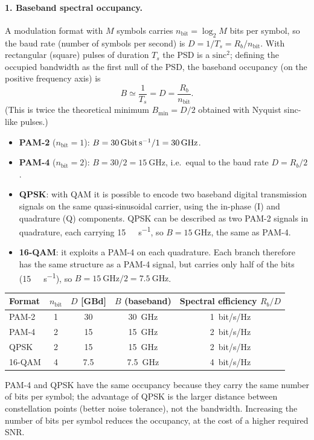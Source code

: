 \paragraph{1. Baseband spectral occupancy.}
A modulation format with $M$ symbols carries $n_\mathrm{bit} = \log_2 M$ bits per symbol, so the baud rate
(number of symbols per second) is $D = 1/T_s = R_b/n_\mathrm{bit}$. With rectangular (square) pulses of duration
$T_s$ the PSD is a $\mathrm{sinc}^2$; defining the occupied bandwidth as the first null of the PSD, the baseband
occupancy (on the positive frequency axis) is
\begin{equation}
  B \simeq \frac{1}{T_s} = D = \frac{R_b}{n_\mathrm{bit}} .
\end{equation}
(This is twice the theoretical minimum $B_\mathrm{min} = D/2$ obtained with Nyquist sinc-like pulses.)
\begin{itemize}
  \item \textbf{PAM-2} ($n_\mathrm{bit}=1$): $B = \SI{30}{\giga\bit\per\second}/1 = \SI{30}{\giga\hertz}$.
  \item \textbf{PAM-4} ($n_\mathrm{bit}=2$): $B = 30/2 = \SI{15}{\giga\hertz}$, i.e.\ equal to the baud rate
        $D = R_b/2$.
  \item \textbf{QPSK}: with QAM it is possible to encode two baseband digital transmission signals on the
        same quasi-sinusoidal carrier, using the in-phase (I) and quadrature (Q) components.
        QPSK can be described as two PAM-2 signals in quadrature, each carrying \SI{15}{\giga\bit\per\second},
        so $B = \SI{15}{\giga\hertz}$, the same as PAM-4.
  \item \textbf{16-QAM}: it exploits a PAM-4 on each quadrature. Each branch therefore has the same structure as
        a PAM-4 signal, but carries only half of the bits (\SI{15}{\giga\bit\per\second}), so
        $B = \SI{15}{\giga\hertz}/2 = \SI{7.5}{\giga\hertz}$.
\end{itemize}
\begin{center}
\begin{tabular}{lcccc}
  \toprule
  Format & $n_\mathrm{bit}$ & $D$ [GBd] & $B$ (baseband) & Spectral efficiency $R_b/D$ \\
  \midrule
  PAM-2  & 1 & 30  & \SI{30}{\giga\hertz}  & \SI{1}{bit/s/Hz} \\
  PAM-4  & 2 & 15  & \SI{15}{\giga\hertz}  & \SI{2}{bit/s/Hz} \\
  QPSK   & 2 & 15  & \SI{15}{\giga\hertz}  & \SI{2}{bit/s/Hz} \\
  16-QAM & 4 & 7.5 & \SI{7.5}{\giga\hertz} & \SI{4}{bit/s/Hz} \\
  \bottomrule
\end{tabular}
\end{center}
PAM-4 and QPSK have the same occupancy because they carry the same number of bits per symbol; the advantage
of QPSK is the larger distance between constellation points (better noise tolerance), not the bandwidth.
Increasing the number of bits per symbol reduces the occupancy, at the cost of a higher required SNR.

